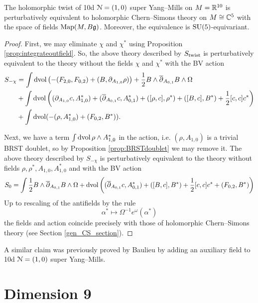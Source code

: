 \documentclass[10pt, oneside]{article}
\begin{document}
\begin{theorem}
The holomorphic twist of 10d $\mathcal{N}=(1, 0)$ super Yang--Mills on $M=\mathbb R^{10}$ is perturbatively equivalent to holomorphic Chern--Simons theory on $M\cong\mathbb C^5$ with the space of fields $\operatorname{Map}(M, B\mathfrak{g})$. Moreover, the equivalence is $\mathrm{SU}(5)$-equivariant.
\label{thm:10dholomorphictwist}
\end{theorem}
\begin{proof}
First, we may eliminate $\chi$ and $\chi^*$ using Proposition \ref{prop:integrateoutfield}. So, the above theory described by $S_{\rm twist}$ is perturbatively equivalent to the theory without the fields $\chi$ and $\chi^*$ with the BV action
\begin{align*}
S_{-\chi} &= \int \operatorname{dvol} \left(-(F_{2, 0}, F_{0, 2}) + (B, \partial_{A_{1, 0}} \rho)\right)  + \frac{1}{2}B\wedge \overline{\partial}_{A_{0, 1}} B\wedge\Omega \\
&+ \int \operatorname{dvol}\left((\partial_{A_{1, 0}} c, A_{1, 0}^*) + (\overline{\partial}_{A_{0, 1}} c, A_{0, 1}^*) + ([\rho, c], \rho^*) + ([B, c], B^*) + \frac{1}{2}[c, c]c^*\right) \\
&+ \int \operatorname{dvol}(-(\rho, A_{1, 0}^*) + (F_{0, 2}, B^*)).
\end{align*}

Next, we have a term $\int \operatorname{dvol} \rho\wedge A_{1, 0}^*$ in the action, i.e. $(\rho, A_{1, 0})$ is a trivial BRST doublet, so by Proposition \ref{prop:BRSTdoublet} we may remove it. 
The above theory described by $S_{-\chi}$ is perturbatively equivalent to the theory without fields $\rho,\rho^*,A_{1,0},A_{1,0}^*$ and with the BV action
\[
S_0 = \int \frac{1}{2}B\wedge \overline{\partial}_{A_{0, 1}} B\wedge\Omega + \operatorname{dvol}\left((\overline{\partial}_{A_{0, 1}} c, A_{0, 1}^*) + ([B, c], B^*) + \frac{1}{2}[c, c]c^* + (F_{0, 2}, B^*)\right)
\]
Up to rescaling of the antifields by the rule
\[
\alpha^* \mapsto \Omega^{-1} e^{\omega} (\alpha^*)
\]
the fields and action coincide precisely with those of holomorphic Chern--Simons theory (see Section \ref{gen_CS_section}).
\end{proof}

\begin{remark}
A similar claim was previously proved by Baulieu \cite{Baulieu} by adding an auxiliary field to 10d $\mathcal{N}=(1, 0)$ super Yang--Mills.
\end{remark}

\section{Dimension 9} \label{9d_section}
\end{document}
